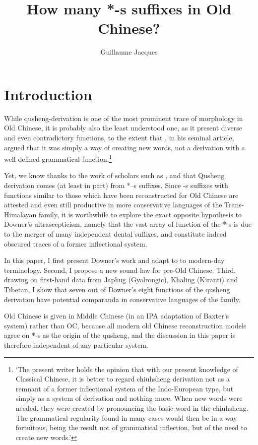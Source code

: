 \documentclass[oldfontcommands,oneside,a4paper,11pt]{article}
\newcommand{\ipa}[1]{{\phon \mbox{#1}}} %
\begin{document}
 
\title{How many *-s suffixes in Old Chinese? }
\author{Guillaume Jacques}
\maketitle
 
\section{Introduction}
While qusheng-derivation is one of the most prominent trace of morphology in Old Chinese, it is probably also the least understood one, as it present diverse and even contradictory functions, to the extent that \citet[262]{downer59}, in his seminal article, argued that it was simply a way of creating new words, not a derivation with a well-defined grammatical function.\footnote{`The present writer holds the opinion that with our present knowledge of Classical Chinese, it is better to regard chiuhsheng derivation not as a remnant of a former inflectional system of the Indo-European type, but simply as a system of derivation and nothing more. When new words were needed, they were created by pronouncing the basic word in the chiuhsheng. The grammatical regularity found in many cases would then be in a way fortuitous, being the result not of grammatical inflection, but of the need to create new words.'}
 
Yet, we know thanks to the work of scholars such as \citet{haudricourt54chinois}, \citet{forrest60occlusives} and \citet{sagart99roc, bs14oc} that Qusheng derivation comes (at least in part) from *\ipa{--s} suffixes. Since \ipa{-s} suffixes with functions similar to those which have been reconstructed for Old Chinese are attested and even still productive in more conservative languages of the Trans-Himalayan family, it is worthwhile to explore the exact opposite hypothesis to Downer's ultrascepticism, namely that the vast array of function of the *-s is due to the merger of many independent dental suffixes, and constitute indeed obscured traces of a former inflectional system.

In this paper, I first present Downer's work and adapt to to modern-day terminology. Second, I propose a new sound law for pre-Old Chinese. Third, drawing on first-hand data from Japhug (Gyalrongic), Khaling (Kiranti) and Tibetan, I show that seven out of Downer's eight functions of the qusheng derivation have potential comparanda in conservative languages of the family.

Old Chinese is given in Middle Chinese (in an IPA adaptation of Baxter's \citeyear{baxter92} system) rather than OC, because all modern old Chinese reconstruction models agree on *\ipa{-s} as the origin of the qusheng, and the discussion in this paper is therefore independent of any particular system.
\end{document}
